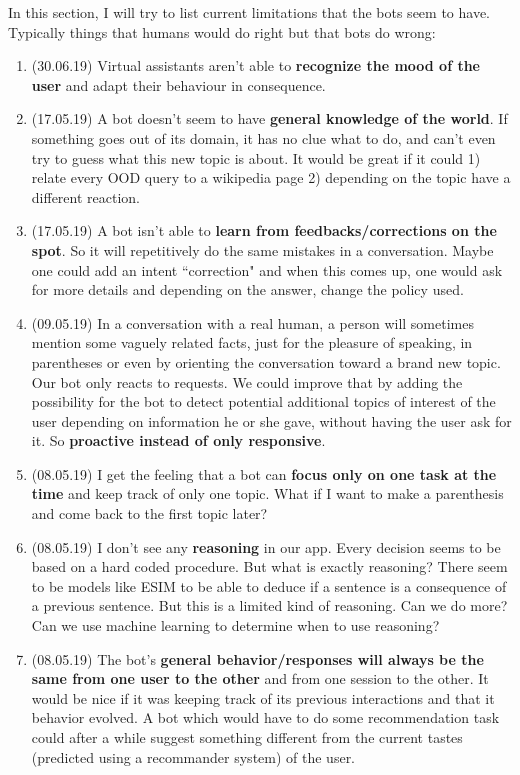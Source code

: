 \documentclass[11pt,a4paper]{article}
\begin{document}
In this section, I will try to list current limitations that the bots seem to have. Typically things that humans would do right but that bots do wrong:
\begin{enumerate}
\item (30.06.19) Virtual assistants aren't able to \textbf{recognize the mood of the user} and adapt their behaviour in consequence.
\item (17.05.19) A bot doesn't seem to have \textbf{general knowledge of the world}. If something goes out of its domain, it has no clue what to do, and can't even try to guess what this new topic is about. It would be great if it could 1) relate every OOD query to a wikipedia page 2) depending on the topic have a different reaction.
\item (17.05.19) A bot isn't able to \textbf{learn from feedbacks/corrections on the spot}. So it will repetitively do the same mistakes in a conversation. Maybe one could add an intent ``correction" and when this comes up, one would ask for more details and depending on the answer, change the policy used.
\item (09.05.19) In a conversation with a real human, a person will sometimes mention some vaguely related facts, just for the pleasure of speaking, in parentheses or even by orienting the conversation toward a brand new topic. Our bot only reacts to requests. We could improve that by adding the possibility for the bot to detect potential additional topics of interest of the user depending on information he or she gave, without having the user ask for it. So \textbf{proactive instead of only responsive}.
\item (08.05.19) I get the feeling that a bot can \textbf{focus only on one task at the time} and keep track of only one topic. What if I want to make a parenthesis and come back to the first topic later?
\item (08.05.19) I don't see any \textbf{reasoning} in our app. Every decision seems to be based on a hard coded procedure. But what is exactly reasoning? There seem to be models like ESIM to be able to deduce if a sentence is a consequence of a previous sentence. But this is a limited kind of reasoning. Can we do more? Can we use machine learning to determine when to use reasoning?
\item (08.05.19) The bot's \textbf{general behavior/responses will always be the same from one user to the other} and from one session to the other. It would be nice if it was keeping track of its previous interactions and that it behavior evolved. A bot which would have to do some recommendation task could after a while suggest something different from the current tastes (predicted using a recommander system) of the user.

\end{enumerate}
\end{document}
